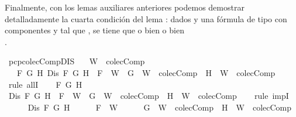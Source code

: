 \begin{isabellebody}
%
\endisadelimproof
%
\begin{isamarkuptext}%
Finalmente, con los lemas auxiliares anteriores podemos demostrar detalladamente la cuarta 
  condición del lema : dados  y  una fórmula de tipo \isa{{\isasymbeta}} con componentes  y 
   tal que , se tiene que o bien  o bien\\ .%
\end{isamarkuptext}\isamarkuptrue%
\isamarkupfalse%
\ pcp{\isacharunderscore}colecComp{\isacharunderscore}DIS{\isacharcolon}\isanewline
\ \ \ {\isachardoublequoteopen}W\ {\isasymin}\ colecComp{\isachardoublequoteclose}\isanewline
\ \ \ {\isachardoublequoteopen}{\isasymforall}F\ G\ H{\isachardot}\ Dis\ F\ G\ H\ {\isasymlongrightarrow}\ F\ {\isasymin}\ W\ {\isasymlongrightarrow}\ {\isacharbraceleft}G{\isacharbraceright}\ {\isasymunion}\ W\ {\isasymin}\ colecComp\ {\isasymor}\ {\isacharbraceleft}H{\isacharbraceright}\ {\isasymunion}\ W\ {\isasymin}\ colecComp{\isachardoublequoteclose}\isanewline
%
\isadelimproof
%
\endisadelimproof
%
\isatagproof
{}\isamarkupfalse%
\ {\isacharparenleft}rule\ allI{\isacharparenright}{\isacharplus}\isanewline
\ \ \isamarkupfalse%
\ F\ G\ H\isanewline
\ \ \isamarkupfalse%
\ {\isachardoublequoteopen}Dis\ F\ G\ H\ {\isasymlongrightarrow}\ F\ {\isasymin}\ W\ {\isasymlongrightarrow}\ {\isacharbraceleft}G{\isacharbraceright}\ {\isasymunion}\ W\ {\isasymin}\ colecComp\ {\isasymor}\ {\isacharbraceleft}H{\isacharbraceright}\ {\isasymunion}\ W\ {\isasymin}\ colecComp{\isachardoublequoteclose}\isanewline
\ \ \isamarkupfalse%
\ {\isacharparenleft}rule\ impI{\isacharparenright}{\isacharplus}\isanewline
\ \ \ \ \isamarkupfalse%
\ {\isachardoublequoteopen}Dis\ F\ G\ H{\isachardoublequoteclose}\isanewline
\ \ \ \ \isamarkupfalse%
\ {\isachardoublequoteopen}F\ {\isasymin}\ W{\isachardoublequoteclose}\isanewline
\ \ \ \ \isamarkupfalse%
\ {\isachardoublequoteopen}{\isacharbraceleft}G{\isacharbraceright}\ {\isasymunion}\ W\ {\isasymin}\ colecComp\ {\isasymor}\ {\isacharbraceleft}H{\isacharbraceright}\ {\isasymunion}\ W\ {\isasymin}\ colecComp{\isachardoublequoteclose}\isanewline

\end{isabellebody}
